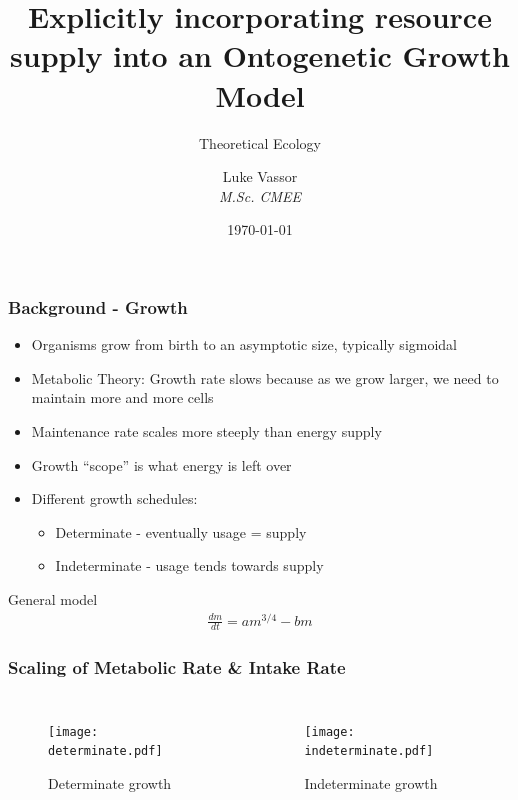 \documentclass[handout]{beamer}
\institute{\texttt{[image: Imperial\_1\_Pantone\_solid.pdf]}}
\title{Explicitly incorporating resource supply into an Ontogenetic Growth Model}
\subtitle{Theoretical Ecology}
\author{Luke Vassor \\ \textit{M.Sc. CMEE}}
\date{\today}
\begin{document}
 
\frame{\titlepage}


\begin{frame}
	\frametitle{Background - Growth}
	\begin{itemize}
		\item Organisms grow from birth to an asymptotic size, typically sigmoidal
		\item Metabolic Theory: Growth rate slows because as we grow larger, we need to maintain more and more cells
		\item Maintenance rate scales more steeply than energy supply
		\item Growth ``scope'' is what energy is left over
		\item Different growth schedules:
		\begin{itemize}
			\item Determinate - eventually usage = supply
			\item Indeterminate - usage tends towards supply
		\end{itemize}
	\end{itemize}

			

	\begin{block}{General model}
		\begin{align*}
			\frac{dm}{dt} = am^{3/4} - bm
		\end{align*}
	\end{block}
\end{frame}


\begin{frame}
	\frametitle{Scaling of Metabolic Rate \& Intake Rate}
	\begin{columns}[b]
			\centering
			\begin{figure}
				\texttt{[image: determinate.pdf]} \
				\caption{Determinate growth}
			\end{figure}
			\centering
			\begin{figure}
				\texttt{[image: indeterminate.pdf]} \
				\caption{Indeterminate growth}
			\end{figure}
	\end{columns}
\end{frame}
\end{document}
